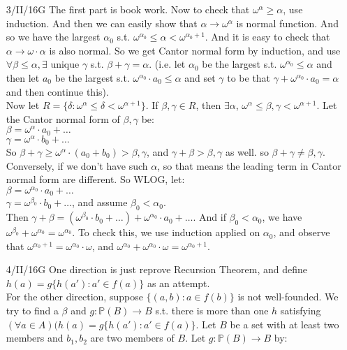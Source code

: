 \begin{enumerate}
\item[3/II/16G] The first part is book work. Now to check that $\omega^\alpha \ge \alpha$, use induction. And then we can easily show that $\alpha \rightarrow \omega^\alpha$ is normal function. And so we have the largest $\alpha_0$ s.t. $\omega^{\alpha_0} \le \alpha< \omega^{\alpha_0+1}$. And it is easy to check that $\alpha \rightarrow \omega \cdot \alpha$ is also normal. So we get Cantor normal form by induction, and use $\forall \beta \le \alpha, \exists$ unique $\gamma$ s.t. $\beta +\gamma =\alpha$. (i.e. let $\alpha_0$ be the largest s.t. $\omega^{\alpha_0} \le \alpha$ and then let $a_0$ be the largest s.t. $\omega^{\alpha_0} \cdot a_0 \le \alpha$ and set $\gamma$ to be that $\gamma + \omega^{\alpha_0} \cdot a_0 = \alpha$ and then continue this).\\
    Now let $R=\{\delta: \omega^\alpha \le \delta< \omega^{\alpha+1} \}$. If $\beta, \gamma \in R$, then $\exists \alpha$, $\omega^\alpha \le \beta, \gamma < \omega^{\alpha+1}$. Let the Cantor normal form of $\beta,\gamma$ be:\\
    $\beta=\omega^\alpha \cdot a_0 + \ldots$\\
    $\gamma=\omega^\alpha \cdot b_0 + \ldots$\\
    So $\beta +\gamma \ge \omega^\alpha \cdot (a_0 + b_0) > \beta, \gamma$, and
    $\gamma +\beta >\beta, \gamma$ as well. so $\beta+\gamma \neq \beta, \gamma$.\\
    Conversely, if we don't have such $\alpha$, so that means the leading term in Cantor normal form are different. So WLOG, let:\\
    $\beta=\omega^{\alpha_0} \cdot a_0 + \ldots$\\
    $\gamma=\omega^{\beta_0} \cdot b_0 + \ldots$, and assume $\beta_0 < \alpha_0$.\\
    Then $\gamma + \beta = (\omega ^{\beta_0} \cdot b_0 +\ldots) + \omega^{\alpha_0} \cdot a_0 +\ldots$. And if $\beta_0 < \alpha_0$, we have $\omega^{\beta_0} + \omega^{\alpha_0} = \omega^{\alpha_0}$. To check this, we use induction applied on $\alpha_0$, and observe that $\omega^{\alpha_0+1}= \omega^{\alpha_0} \cdot \omega$, and $\omega^{\alpha_0} + \omega^{\alpha_0} \cdot \omega = \omega^{\alpha_0+1}$.\\
\item[4/II/16G] One direction is just reprove Recursion Theorem, and define $h(a)=g\{h(a'): a' \in f(a)\}$ as an attempt.\\
    For the other direction, suppose $\{(a,b): a \in f(b)\}$ is not well-founded. We try to find a $\beta$ and $g: \mathbb{P}(B) \rightarrow B$ s.t. there is more than one $h$ satisfying $(\forall a \in A)(h(a)=g\{h(a'): a' \in f(a)\}$. Let $B$ be a set with at least two members and $b_1,b_2$ are two members of $B$. Let $g: \mathbb{P}(B) \rightarrow B$ by:

\end{enumerate}
